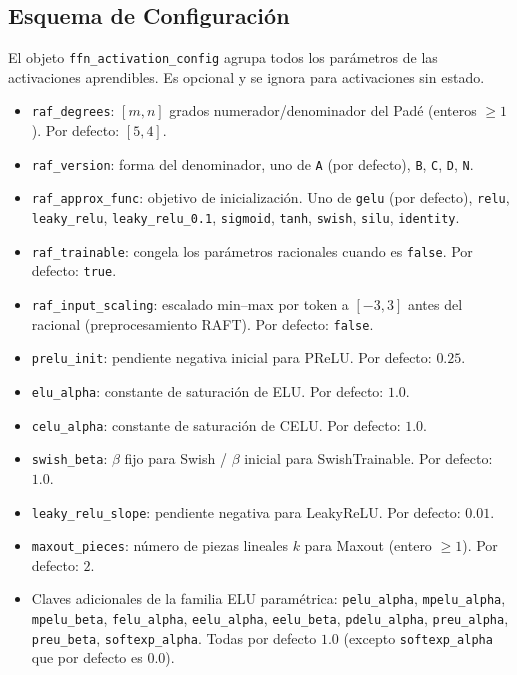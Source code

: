 \subsection{Esquema de Configuración}

El objeto \texttt{ffn\_activation\_config} agrupa todos los parámetros de las
activaciones aprendibles. Es opcional y se ignora para activaciones sin estado.

\begin{itemize}[leftmargin=*]
  \item \texttt{raf\_degrees}: $[m,n]$ grados numerador/denominador del Pad\'e
    (enteros $\ge 1$). Por defecto: $[5,4]$.
  \item \texttt{raf\_version}: forma del denominador, uno de
    \texttt{A} (por defecto), \texttt{B}, \texttt{C}, \texttt{D}, \texttt{N}.
  \item \texttt{raf\_approx\_func}: objetivo de inicialización. Uno de
    \texttt{gelu} (por defecto), \texttt{relu}, \texttt{leaky\_relu},
    \texttt{leaky\_relu\_0.1}, \texttt{sigmoid}, \texttt{tanh},
    \texttt{swish}, \texttt{silu}, \texttt{identity}.
  \item \texttt{raf\_trainable}: congela los parámetros racionales cuando es
    \texttt{false}. Por defecto: \texttt{true}.
  \item \texttt{raf\_input\_scaling}: escalado min--max por token a $[-3,3]$
    antes del racional (preprocesamiento RAFT). Por defecto: \texttt{false}.
  \item \texttt{prelu\_init}: pendiente negativa inicial para PReLU.
    Por defecto: $0.25$.
  \item \texttt{elu\_alpha}: constante de saturación de ELU. Por defecto: $1.0$.
  \item \texttt{celu\_alpha}: constante de saturación de CELU. Por defecto: $1.0$.
  \item \texttt{swish\_beta}: $\beta$ fijo para Swish / $\beta$ inicial para
    SwishTrainable. Por defecto: $1.0$.
  \item \texttt{leaky\_relu\_slope}: pendiente negativa para LeakyReLU.
    Por defecto: $0.01$.
  \item \texttt{maxout\_pieces}: número de piezas lineales $k$ para Maxout
    (entero $\ge 1$). Por defecto: $2$.
  \item Claves adicionales de la familia ELU paramétrica:
    \texttt{pelu\_alpha}, \texttt{mpelu\_alpha}, \texttt{mpelu\_beta},
    \texttt{felu\_alpha}, \texttt{eelu\_alpha}, \texttt{eelu\_beta},
    \texttt{pdelu\_alpha}, \texttt{preu\_alpha}, \texttt{preu\_beta},
    \texttt{softexp\_alpha}. Todas por defecto $1.0$ (excepto
    \texttt{softexp\_alpha} que por defecto es $0.0$).
\end{itemize}

